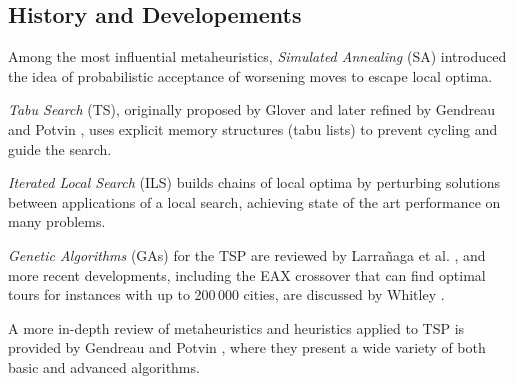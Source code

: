 \subsection{History and Developements}

Among the most influential metaheuristics, \textit{Simulated Annealing} (SA) introduced the idea of probabilistic acceptance of worsening moves to escape local optima.

\textit{Tabu Search} (TS), originally proposed by Glover \cite{regoLocalSearchMetaheuristics} and later refined by Gendreau and Potvin \cite{gendreauTabuSearch2019},
uses explicit memory structures (tabu lists) to prevent cycling and guide the search.

\textit{Iterated Local Search} (ILS) \cite{lourencoIteratedLocalSearch2019} builds chains of local optima by perturbing solutions between applications of a local search,
achieving state of the art performance on many problems.

\textit{Genetic Algorithms} (GAs) for the TSP are reviewed by Larra{\~n}aga et al.
\cite{larranagaGeneticAlgorithmsTravelling1999}, and more recent developments,
including the EAX crossover that can find optimal tours for instances with up to 200\,000 cities, are discussed by Whitley \cite{whitleyNextGenerationGenetic2019}.

A more in-depth review of metaheuristics and heuristics applied to TSP is provided by Gendreau and Potvin \cite{gendreauHandbookMetaheuristics2019}, where they present a wide variety of both basic and advanced algorithms.

